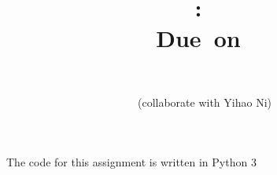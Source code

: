 \documentclass[12pt]{article}
\title{
\vspace{2in}
\textmd{\textbf{\hmwkClass:\ \hmwkTitle}}\\
\normalsize\vspace{0.1in}\small{Due\ on\ \hmwkDueDate}\\
\vspace{0.1in}
\vspace{3in}
}
\author{\textbf{\hmwkAuthorName}\\ \textbf{\hmwkAuthorID}}
\date{(collaborate with Yihao Ni)} %
\begin{document}
\maketitle
\clearpage







The code for this assignment is written in Python 3
\clearpage
\end{document}
